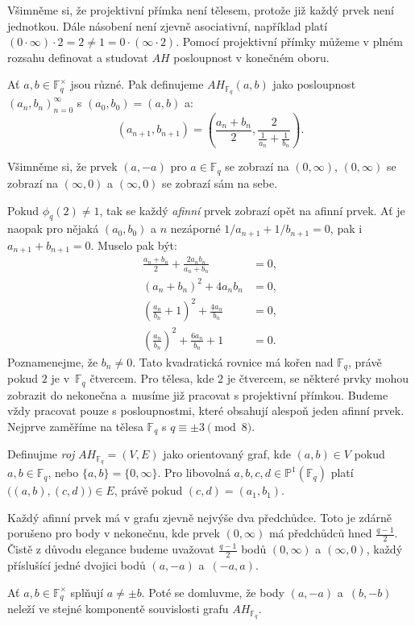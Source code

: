 \documentclass[12pt]{report}
\begin{document}
Všimněme si, že projektivní přímka není tělesem, protože již každý prvek není jednotkou. Dále násobení není zjevně asociativní, například platí $(0 \cdot \infty) \cdot 2 = 2 \neq   1 = 0 \cdot (\infty \cdot 2)$. Pomocí projektivní přímky můžeme v plném rozsahu definovat a studovat $AH$ posloupnost v konečném oboru.

\begin{definice}
Ať $a,b \in \mathbb{F}_q ^{\times}$ jsou různé. Pak definujeme $AH_{\mathbb{F}_q}(a,b)$ jako posloupnost $(a_n,b_n)_{n=0}^{\infty}$ s $(a_0,b_0) = (a,b)$ a:
\begin{equation*}
\left(a_{n+1},b_{n+1} \right) = \left(\frac{a_n+b_n}{2}, \frac{2}{\frac{1}{a_n} + \frac{1}{b_n}} \right).
\end{equation*}
\end{definice}

Všimněme si, že prvek $(a,-a)$ pro $a \in \mathbb{F}_q$ se zobrazí na $(0,\infty)$, $(0,\infty)$ se zobrazí na $(\infty,0)$ a $(\infty,0)$ se zobrazí sám na sebe. 

Pokud $\phi_q(2) \neq 1$, tak se každý \textit{afinní} prvek zobrazí opět na afinní prvek. Ať je naopak pro nějaká $(a_0,b_0)$ a $n$ nezáporné $1/a_{n+1} + 1/b_{n+1} = 0$, pak i $a_{n+1} + b_{n+1} = 0$. Muselo pak být:
\begin{align*}
\frac{a_n+b_n}{2} + \frac{2 a_n b_n}{a_n + b_n} &= 0,\\
(a_n+b_n)^2 + 4 a_n b_n &= 0,\\
\left(\frac{a_n}{b_n} + 1 \right)^2 + \frac{4a_n}{b_n} &= 0,\\
\left(\frac{a_n}{b_n}\right)^2 + \frac{6a_n}{b_n} + 1 &= 0.
\end{align*}
Poznamenejme, že $b_n \neq 0$. Tato kvadratická rovnice má kořen nad $\mathbb{F}_q$, právě pokud $2$ je v~$\mathbb{F}_q$ čtvercem. Pro tělesa, kde $2$ je čtvercem, se některé prvky mohou zobrazit do nekonečna a~musíme již pracovat s projektivní přímkou. Budeme vždy pracovat pouze s posloupnostmi, které obsahují alespoň jeden afinní prvek. Nejprve zaměříme na tělesa $\mathbb{F}_q$ s $q \equiv \pm 3 \pmod{8}$.

\begin{definice}
Definujme \textit{roj} $AH_{\mathbb{F}_q} = (V,E)$ jako orientovaný graf, kde $(a,b) \in V$ pokud $a,b \in \mathbb{F}_q$, nebo $\lbrace a,b \rbrace = \lbrace 0,\infty \rbrace$. Pro libovolná $a,b,c,d \in \mathbb{P}^1 (\mathbb{F}_q)$ platí $\Big((a,b), (c,d) \Big) \in E$, právě pokud $(c,d) = (a_1,b_1)$. 
\end{definice}
Každý afinní prvek má v grafu zjevně nejvýše dva předchůdce. Toto je zdárně porušeno pro body v nekonečnu, kde prvek $(0,\infty)$ má předchůdců hned $\frac{q-1}{2}$. Čistě z důvodu elegance budeme uvažovat $\frac{q-1}{2}$ bodů $(0,\infty)$ a $(\infty,0)$, každý příslušící jedné dvojici bodů $(a,-a)$ a~$(-a,a)$. 
\begin{umluva}
Ať $a,b \in \mathbb{F}_q ^{\times}$ splňují $a \neq \pm b$. Poté se domluvme, že body $(a,-a)$ a~$(b,-b)$ neleží ve stejné komponentě souvislosti grafu $AH_{\mathbb{F}_q}$. 
\end{umluva}
\end{document}
